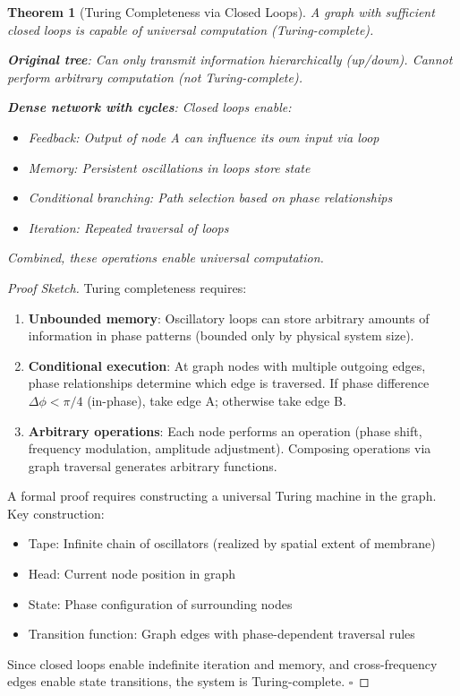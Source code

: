 \documentclass[11pt,a4paper]{article}
\newtheorem{theorem}{Theorem}[section]
\theoremstyle{definition}
\theoremstyle{remark}
\begin{document}
\begin{theorem}[Turing Completeness via Closed Loops]
\label{thm:turing_complete}
A graph with sufficient closed loops is capable of universal computation (Turing-complete).

\textbf{Original tree}: Can only transmit information hierarchically (up/down). Cannot perform arbitrary computation (not Turing-complete).

\textbf{Dense network with cycles}: Closed loops enable:
\begin{itemize}
\item Feedback: Output of node A can influence its own input via loop
\item Memory: Persistent oscillations in loops store state
\item Conditional branching: Path selection based on phase relationships
\item Iteration: Repeated traversal of loops
\end{itemize}

Combined, these operations enable universal computation.
\end{theorem}

\begin{proof}[Proof Sketch]
Turing completeness requires:
\begin{enumerate}
\item \textbf{Unbounded memory}: Oscillatory loops can store arbitrary amounts of information in phase patterns (bounded only by physical system size).

\item \textbf{Conditional execution}: At graph nodes with multiple outgoing edges, phase relationships determine which edge is traversed. If phase difference $\Delta\phi < \pi/4$ (in-phase), take edge A; otherwise take edge B.

\item \textbf{Arbitrary operations}: Each node performs an operation (phase shift, frequency modulation, amplitude adjustment). Composing operations via graph traversal generates arbitrary functions.
\end{enumerate}

A formal proof requires constructing a universal Turing machine in the graph. Key construction:
\begin{itemize}
\item Tape: Infinite chain of oscillators (realized by spatial extent of membrane)
\item Head: Current node position in graph
\item State: Phase configuration of surrounding nodes
\item Transition function: Graph edges with phase-dependent traversal rules
\end{itemize}

Since closed loops enable indefinite iteration and memory, and cross-frequency edges enable state transitions, the system is Turing-complete. $\square$
\end{proof}
\end{document}
